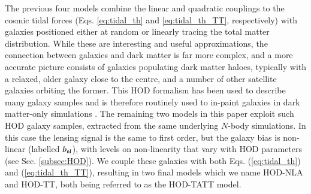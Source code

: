The previous four models combine the linear and quadratic couplings to the cosmic tidal forces  (Eqs. \ref{eq:tidal_th} and \ref{eq:tidal_th_TT}, respectively) with galaxies positioned  either at random or linearly tracing the total matter distribution.
While these are interesting and useful approximations, the connection between galaxies and dark matter is far more complex, and a more accurate picture consists of galaxies populating dark matter haloes, typically with a relaxed, older galaxy close to the centre, and a number of other satellite galaxies orbiting the former.
This HOD formalism has been used to describe many galaxy samples \citep[\eg][]{SDSS-HOD, BOSS-HOD, GAMA-HOD, DESI-HOD} and is therefore routinely used to in-paint galaxies in dark matter-only simulations \citep{MICE-HOD, SLICS,  Abbacus-HOD, Balrog}.
The remaining two models in this paper exploit such HOD galaxy samples, extracted from the same underlying $N$-body simulations. In this case the lensing signal is the same to first order, but the galaxy bias is non-linear (labelled $b_{\rm nl}$), with levels on non-linearity that vary with HOD parameters (see Sec. \ref{subsec:HOD}).
We couple these galaxies with both Eqs. (\ref{eq:tidal_th}) and (\ref{eq:tidal_th_TT}), resulting in two final models which we name  HOD-NLA and  HOD-TT, both being referred to as the HOD-TATT model.



